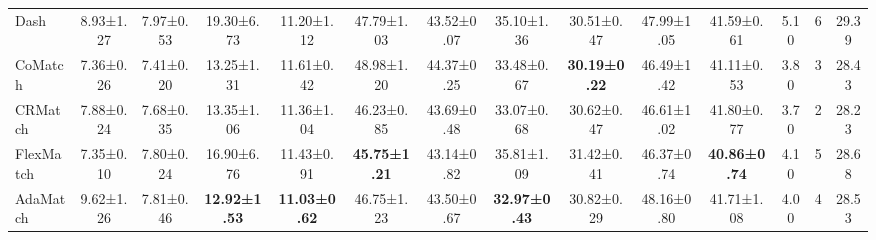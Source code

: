 \documentclass{article}
\begin{document}
\begin{table}[t!]
{\begin{tabular}{l|cc|cc|cc|cc|cc|c|c|c}
Dash             & 8.93\tiny{±1.27}                       & 7.97\tiny{±0.53}                        & 19.30\tiny{±6.73}                       & 11.20\tiny{±1.12}                        & 47.79\tiny{±1.03}                              & 43.52\tiny{±0.07}                               & 35.10\tiny{±1.36}                              & 30.51\tiny{±0.47}                               & 47.99\tiny{±1.05}                            & 41.59\tiny{±0.61}                             & 5.10                              & 6                              & 29.39                               \\
CoMatch          & 7.36\tiny{±0.26}                       & 7.41\tiny{±0.20}                        & 13.25\tiny{±1.31}                       & 11.61\tiny{±0.42}                        & 48.98\tiny{±1.20}                              & 44.37\tiny{±0.25}                               & 33.48\tiny{±0.67}                              & \textbf{30.19\tiny{±0.22}}                      & 46.49\tiny{±1.42}                            & 41.11\tiny{±0.53}                             & 3.80                              & 3                              & 28.43                               \\
CRMatch          & 7.88\tiny{±0.24}                       & 7.68\tiny{±0.35}                        & 13.35\tiny{±1.06}                       & 11.36\tiny{±1.04}                        & 46.23\tiny{±0.85}                              & 43.69\tiny{±0.48}                               & 33.07\tiny{±0.68}                              & 30.62\tiny{±0.47}                               & 46.61\tiny{±1.02}                            & 41.80\tiny{±0.77}                             & 3.70                              & 2                              & 28.23                               \\
FlexMatch        & 7.35\tiny{±0.10}                       & 7.80\tiny{±0.24}                        & 16.90\tiny{±6.76}                       & 11.43\tiny{±0.91}                        & \textbf{45.75\tiny{±1.21}}                     & 43.14\tiny{±0.82}                               & 35.81\tiny{±1.09}                              & 31.42\tiny{±0.41}                               & 46.37\tiny{±0.74}                            & \textbf{40.86\tiny{±0.74}}                    & 4.10                              & 5                              & 28.68                               \\
AdaMatch         & 9.62\tiny{±1.26}                       & 7.81\tiny{±0.46}                        & \textbf{12.92\tiny{±1.53}}              & \textbf{11.03\tiny{±0.62}}               & 46.75\tiny{±1.23}                              & 43.50\tiny{±0.67}                               & \textbf{32.97\tiny{±0.43}}                     & 30.82\tiny{±0.29}                               & 48.16\tiny{±0.80}                            & 41.71\tiny{±1.08}                             & 4.00                              & 4                              & 28.53                               \\

\end{tabular}}
\end{table}
\end{document}
